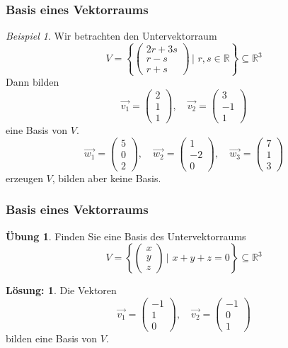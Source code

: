 \documentclass[hyperref={pdfpagelabels=false}]{beamer}
\theoremstyle{plain}%
\theoremstyle{definition}
\newtheorem*{uebung}{Übung}
\newtheorem*{sol}{Lösung:}
\theoremstyle{remark}
\newtheorem*{beispiel}{Beispiel}
\def \R{\mathbb R}
\newcommand{\vektor}[1]{\overrightarrow{#1}}
\begin{document}
\begin{frame}
\frametitle{Basis eines Vektorraums}

\begin{beispiel}
Wir betrachten den Untervektorraum 
	$$ V = \left\{ \begin{pmatrix} 2r + 3s \\ r-s \\ r+s \end{pmatrix} \,\vert \,\,r, s \in \R \right\} \subseteq \R^3 $$ \pause
Dann bilden 
	$$\vektor{v_1} = \left( \begin{smallmatrix} 2 \\ 1 \\ 1 \end{smallmatrix} \right), \quad 
	\vektor{v_2} = \left( \begin{smallmatrix} 3 \\ -1 \\  1 \end{smallmatrix} \right) $$ 
eine Basis von $V$. \pause 
	$$\vektor{w_1} = \left( \begin{smallmatrix} 5 \\ 0 \\ 2 \end{smallmatrix} \right), \quad 
	\vektor{w_2} = \left( \begin{smallmatrix} 1 \\ -2 \\  0 \end{smallmatrix} \right), \quad 
	\vektor{w_3} = \left( \begin{smallmatrix} 7 \\ 1 \\  3 \end{smallmatrix} \right)  $$ 
erzeugen $V$, bilden aber keine Basis.  
\end{beispiel}
\end{frame}

\begin{frame}
\frametitle{Basis eines Vektorraums}

\begin{uebung}
Finden Sie eine Basis des Untervektorraums 
	$$ V =  \left\{ \begin{pmatrix} x \\ y \\ z \end{pmatrix} \,\vert \,\, x + y + z = 0 \right\} \subseteq \R^3 $$
\end{uebung}

\pause \pause 
\begin{sol}
Die Vektoren 
	$$\vektor{v_1} = \left( \begin{matrix} -1 \\ 1 \\  0 \end{matrix} \right), \quad 
	\vektor{v_2} = \left( \begin{matrix} -1 \\ 0 \\  1 \end{matrix} \right) $$ 
bilden eine Basis von $V$.
\end{sol}
\end{frame}
\end{document}
